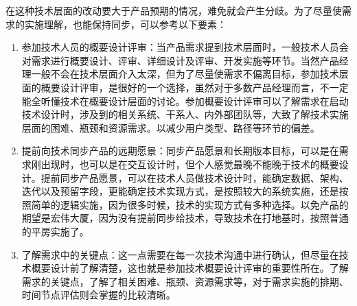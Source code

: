 \documentclass[letterpaper,11pt,english]{sphinxmanual}
\begin{document}
在这种技术层面的改动要大于产品预期的情况，难免就会产生分歧。为了尽量使需求的实施理解，也能保持同步，可以参考以下要素：
\begin{enumerate}
%
\item {} 
参加技术人员的概要设计评审：当产品需求提到技术层面时，一般技术人员会对需求进行概要设计、评审、详细设计及评审、开发实施等环节。当然产品经理一般不会在技术层面介入太深，但为了尽量使需求不偏离目标，参加技术层面的概要设计评审，是很好的一个选择，虽然对于多数产品经理而言，不一定能全听懂技术在概要设计层面的讨论。参加概要设计评审可以了解需求在启动技术设计时，涉及到的相关系统、干系人、内外部团队等，大致了解技术实施层面的困难、瓶颈和资源需求。以减少用户类型、路径等环节的偏差。

\item {} 
提前向技术同步产品的远期愿景：同步产品愿景和长期版本目标，可以是在需求刚出现时，也可以是在交互设计时，但个人感觉最晚不能晚于技术的概要设计。提前同步产品愿景，可以在技术人员做技术设计时，能确定数据、架构、迭代以及预留字段，更能确定技术实现方式，是按照较大的系统实施，还是按照简单的逻辑实施，因为很多时候，技术的实现方式有多种选择。以免产品的期望是宏伟大厦，因为没有提前同步给技术，导致技术在打地基时，按照普通的平房实施了。

\item {} 
了解需求中的关键点：这一点需要在每一次技术沟通中进行确认，但尽量在技术概要设计前了解清楚，这也就是参加技术概要设计评审的重要性所在。了解需求的关键点，了解了相关困难、瓶颈、资源需求等，对于需求实施的排期、时间节点评估则会掌握的比较清晰。

\end{enumerate}
\end{document}
